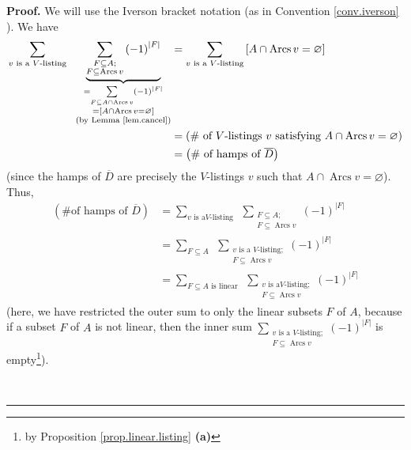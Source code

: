 \documentclass[numbers=enddot,12pt,final,onecolumn,notitlepage]{scrartcl}%
\numberwithin{exer}{section}
\theoremstyle{definition}
\newenvironment{proof}[1][Proof]{\noindent\textbf{#1.} }{\ \rule{0.5em}{0.5em}}
\let\sumnonlimits\sum
\renewcommand{\sum}{\sumnonlimits\limits}
\newenvironment{vershort}{}{}
\begin{document}
\begin{vershort}


\begin{proof}
We will use the Iverson bracket notation (as in Convention \ref{conv.iverson}%
). We have%
\begin{align*}
\sum_{v\text{ is a }V\text{-listing}}\ \ \underbrace{\sum
_{\substack{F\subseteq A;\\F\subseteq\operatorname*{Arcs}v}}\left(  -1\right)
^{\left\vert F\right\vert }}_{\substack{=\sum_{F\subseteq A\cap
\operatorname*{Arcs}v}\left(  -1\right)  ^{\left\vert F\right\vert }\\=\left[
A\cap\operatorname*{Arcs}v=\varnothing\right]  \\\text{(by Lemma
\ref{lem.cancel})}}}  &  =\sum_{v\text{ is a }V\text{-listing}}\left[
A\cap\operatorname*{Arcs}v=\varnothing\right] \\
&  =\left(  \text{\# of }V\text{-listings }v\text{ satisfying }A\cap
\operatorname*{Arcs}v=\varnothing\right) \\
&  =\left(  \text{\# of hamps of }\overline{D}\right)
\end{align*}
(since the hamps of $\overline{D}$ are precisely the $V$-listings $v$ such
that $A\cap\operatorname*{Arcs}v=\varnothing$). Thus,%
\begin{align}
\left(  \text{\# of hamps of }\overline{D}\right)   &  =\sum_{v\text{ is a
}V\text{-listing}}\ \ \sum_{\substack{F\subseteq A;\\F\subseteq
\operatorname*{Arcs}v}}\left(  -1\right)  ^{\left\vert F\right\vert
}\nonumber\\
&  =\sum_{F\subseteq A}\ \ \sum_{\substack{v\text{ is a }V\text{-listing;}%
\\F\subseteq\operatorname*{Arcs}v}}\left(  -1\right)  ^{\left\vert
F\right\vert }\nonumber\\
&  =\sum_{F\subseteq A\text{ is linear}}\ \ \sum_{\substack{v\text{ is a
}V\text{-listing;}\\F\subseteq\operatorname*{Arcs}v}}\left(  -1\right)
^{\left\vert F\right\vert } \label{pf.lem.hamps-by-lin.short.4}%
\end{align}
(here, we have restricted the outer sum to only the linear subsets $F$ of $A$,
because if a subset $F$ of $A$ is not linear, then the inner sum
$\sum_{\substack{v\text{ is a }V\text{-listing;}\\F\subseteq
\operatorname*{Arcs}v}}\left(  -1\right)  ^{\left\vert F\right\vert }$ is
empty\footnote{by Proposition \ref{prop.linear.listing} \textbf{(a)}}).


\end{proof}
\end{vershort}
\end{document}
